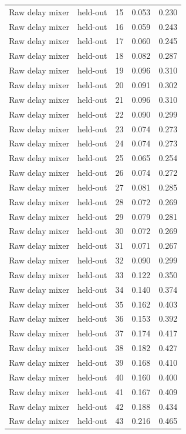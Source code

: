\begin{tabular}{llrrr}
Raw delay mixer & held-out & 15 & 0.053 & 0.230 \\
Raw delay mixer & held-out & 16 & 0.059 & 0.243 \\
Raw delay mixer & held-out & 17 & 0.060 & 0.245 \\
Raw delay mixer & held-out & 18 & 0.082 & 0.287 \\
Raw delay mixer & held-out & 19 & 0.096 & 0.310 \\
Raw delay mixer & held-out & 20 & 0.091 & 0.302 \\
Raw delay mixer & held-out & 21 & 0.096 & 0.310 \\
Raw delay mixer & held-out & 22 & 0.090 & 0.299 \\
Raw delay mixer & held-out & 23 & 0.074 & 0.273 \\
Raw delay mixer & held-out & 24 & 0.074 & 0.273 \\
Raw delay mixer & held-out & 25 & 0.065 & 0.254 \\
Raw delay mixer & held-out & 26 & 0.074 & 0.272 \\
Raw delay mixer & held-out & 27 & 0.081 & 0.285 \\
Raw delay mixer & held-out & 28 & 0.072 & 0.269 \\
Raw delay mixer & held-out & 29 & 0.079 & 0.281 \\
Raw delay mixer & held-out & 30 & 0.072 & 0.269 \\
Raw delay mixer & held-out & 31 & 0.071 & 0.267 \\
Raw delay mixer & held-out & 32 & 0.090 & 0.299 \\
Raw delay mixer & held-out & 33 & 0.122 & 0.350 \\
Raw delay mixer & held-out & 34 & 0.140 & 0.374 \\
Raw delay mixer & held-out & 35 & 0.162 & 0.403 \\
Raw delay mixer & held-out & 36 & 0.153 & 0.392 \\
Raw delay mixer & held-out & 37 & 0.174 & 0.417 \\
Raw delay mixer & held-out & 38 & 0.182 & 0.427 \\
Raw delay mixer & held-out & 39 & 0.168 & 0.410 \\
Raw delay mixer & held-out & 40 & 0.160 & 0.400 \\
Raw delay mixer & held-out & 41 & 0.167 & 0.409 \\
Raw delay mixer & held-out & 42 & 0.188 & 0.434 \\
Raw delay mixer & held-out & 43 & 0.216 & 0.465 \\

\end{tabular}
